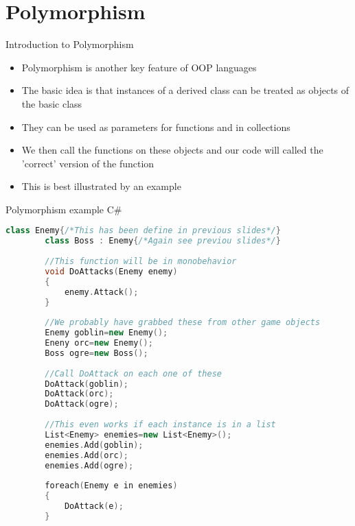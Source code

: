 \part{Polymorphism}
\frame{\partpage}

\begin{frame}{Introduction to Polymorphism}
	\begin{itemize}
		\pause \item Polymorphism is another key feature of OOP languages
		\pause \item The basic idea is that instances of a derived class can be treated as objects of the basic class
		\pause \item They can be used as parameters for functions and in collections
		\pause \item We then call the functions on these objects and our code will called the 'correct' version of the function
		\pause \item This is best illustrated by an example 
	\end{itemize}
\end{frame}

\begin{frame}[fragile]{Polymorphism example C\#}
		\begin{lstlisting}[language=C++,basicstyle=\tiny,]
		class Enemy{/*This has been define in previous slides*/}
		class Boss : Enemy{/*Again see previou slides*/}
		
		//This function will be in monobehavior
		void DoAttacks(Enemy enemy)
		{
			enemy.Attack();
		}
		
		//We probably have grabbed these from other game objects
		Enemy goblin=new Enemy();
		Eneny orc=new Enemy();
		Boss ogre=new Boss();
		
		//Call DoAttack on each one of these
		DoAttack(goblin);
		DoAttack(orc);
		DoAttack(ogre);
		
		//This even works if each instance is in a list
		List<Enemy> enemies=new List<Enemy>();
		enemies.Add(goblin);
		enemies.Add(orc);
		enemies.Add(ogre);
		
		foreach(Enemy e in enemies)
		{
			DoAttack(e);
		}
		\end{lstlisting}
\end{frame}


